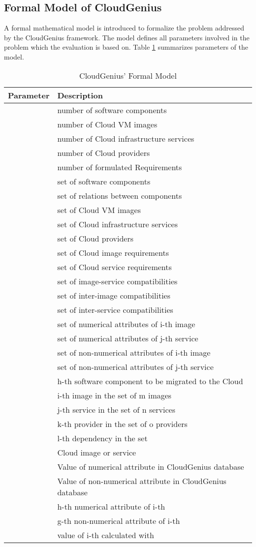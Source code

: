 \documentclass[10pt]{article}
\begin{document}
\subsection{Formal Model of CloudGenius}

A formal mathematical model is introduced to formalize the problem addressed by the CloudGenius framework. The model defines all parameters involved in the problem which the evaluation is based on.
Table \ref{cloudgenius-math-model} summarizes parameters of the model. 

\begin{table}[!h]
\centering
\caption{CloudGenius' Formal Model}\label{cloudgenius-math-model}
\begin{tabular}{|l|p{4in}|} \hline
Parameter&Description\\ \hline
&number of software components\\
&number of Cloud VM images\\
&number of Cloud infrastructure services\\
&number of Cloud providers\\
&number of formulated Requirements\\
&set of software components\\
&set of relations between components\\
&set of Cloud VM images\\
&set of Cloud infrastructure services\\
&set of Cloud providers\\
&set of Cloud image requirements\\
&set of Cloud service requirements\\
&set of image-service compatibilities\\
&set of inter-image compatibilities\\
&set of inter-service compatibilities\\
&set of numerical attributes of i-th image\\
&set of numerical attributes of j-th service\\
&set of non-numerical attributes of i-th image\\
&set of non-numerical attributes of j-th service\\
&h-th software component to be migrated to the Cloud\\ 
&i-th image in the set of m images\\
&j-th service in the set of n services\\ 
&k-th provider in the set of o providers\\
&l-th dependency  in the set \\ 
&Cloud image or service \\
&Value of numerical attribute  in CloudGenius database\\ 
&Value of non-numerical attribute  in CloudGenius database\\ 
&h-th numerical attribute of i-th \\
&g-th non-numerical attribute of i-th \\
&value of i-th  calculated with \\
\hline
\end{tabular}
\end{table}
\end{document}
